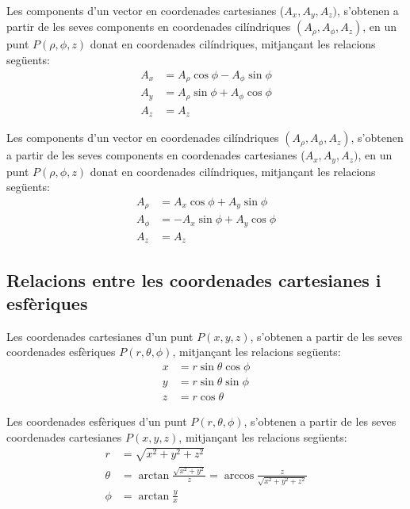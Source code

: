 \documentclass[catalan,a4paper,twoside,11pt]{article}
\begin{document}
Les components d'un vector en coordenades cartesianes ($A_x, A_y, A_z)$, s'obtenen a partir de les seves components en coordenades cilíndriques $(A_\rho, A_\phi, A_z)$, en un punt $P(\rho,\phi,z)$ donat en coordenades cilíndriques, mitjançant les relacions següents:
\begin{subequations}\begin{align}
    A_x &=A_\rho \cos\phi -A_\phi\sin\phi \\
    A_y &=A_\rho\sin\phi +A_\phi\cos\phi\\
    A_z &= A_z
\end{align}\end{subequations}

Les components d'un vector en coordenades cilíndriques $(A_\rho, A_\phi, A_z)$, s'obtenen a partir de les seves components en coordenades cartesianes ($A_x, A_y, A_z)$, en un punt $P(\rho,\phi,z)$ donat en coordenades cilíndriques, mitjançant les relacions següents:
\begin{subequations}\begin{align}
    A_\rho &=  A_x\cos\phi+A_y\sin\phi\\
    A_\phi &= -A_x\sin\phi+A_y\cos\phi \\
    A_z &= A_z
\end{align}\end{subequations}


\subsection{Relacions entre les coordenades cartesianes i
esfèriques}

Les coordenades cartesianes  d'un punt $P(x,y,z)$, s'obtenen a partir
de les seves coordenades esfèriques $P(r,\theta,\phi)$,
mitjançant les relacions següents:
\begin{subequations}\begin{align}
    x &=r\sin\theta\cos\phi \\ y &=r\sin\theta\sin\phi \\ z &=r\cos\theta
\end{align}\end{subequations}

Les coordenades  esfèriques  d'un punt $P(r,\theta,\phi)$,
s'obtenen a partir de les seves coordenades cartesianes $P(x,y,z)$,
mitjançant les relacions següents:
\begin{subequations}\begin{align}
    r &=\sqrt{x^2+y^2+z^2}\\
    \theta&=\arctan{\frac{\sqrt{x^2+y^2}}{z}}=\arccos\frac{z}{\sqrt{x^2+y^2+z^2}}\\[1mm]
    \phi &=\arctan\frac{y}{x}
\end{align}\end{subequations}
\end{document}
